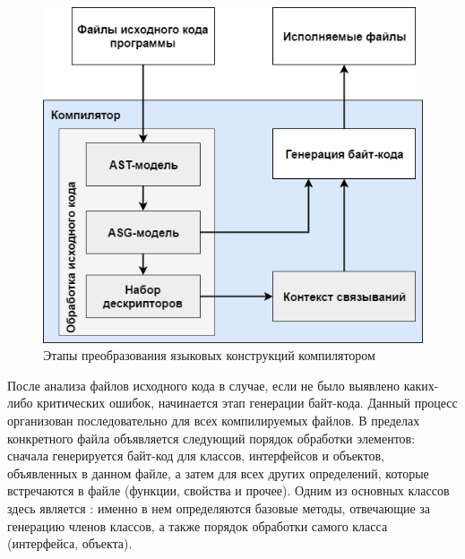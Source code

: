 \begin{figure}[htbp]
    \centering
    \includegraphics[width=\textwidth]{resources/06/04_compiler_flow_diagram.png}
    \caption{Этапы преобразования языковых конструкций компилятором}
    \label{fig05:binding-trace-scheme}
\end{figure}

После анализа файлов исходного кода в случае, если не было выявлено каких-либо критических ошибок, начинается этап генерации байт-кода. Данный процесс организован последовательно для всех компилируемых файлов. %
В пределах конкретного файла объявляется следующий порядок обработки элементов: сначала генерируется байт-код для классов, интерфейсов и объектов, объявленных в данном файле, а затем для всех других определений, которые встречаются в файле (функции, свойства и прочее). Одним из основных классов здесь является : именно в нем определяются базовые методы, отвечающие за генерацию членов классов, а также порядок обработки самого класса (интерфейса, объекта). 

